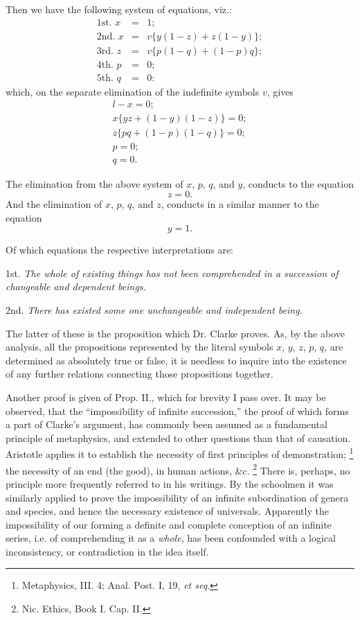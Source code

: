 \documentclass[oneside]{book}
\begin{document}
Then we have the following system of equations, viz.:
\begin{eqnarray*}
\textrm{1st. } x &=& 1 ; \\
\textrm{2nd. } x &=& v \{y(1 - z) + z(1 - y)\} ; \\
\textrm{3rd. } z &=& v \{p(1 - q) + (1 - p)q\} ; \\
\textrm{4th. } p &=& 0; \\
\textrm{5th. } q &=& 0 :
\end{eqnarray*}
which, on the separate elimination of the indefinite symbols $v$,
gives
\setcounter{equation}{0}
\begin{eqnarray}
l-x = 0; \\ %
x\{yz+(1-y)(1-z)\}=0; \\ %
z\{pq+(1-p)(1-q)\}=0; \\ %
p = 0; \\ %
q = 0.  %
\end{eqnarray}

The elimination from the above system of $x$, $p$, $q$, and $y$,
conducts to the equation
\[z=0.\]
And the elimination of $x$, $p$, $q$, and $z$, conducts in a similar
manner to the equation
\[y=1.\]

Of which equations the respective interpretations are:

1st. \textit{The whole of existing things has not been comprehended
in a succession of changeable and dependent beings.}

2nd. \textit{There has existed some one unchangeable and independent
being.}

The latter of these is the proposition which Dr. Clarke proves.
As, by the above analysis, all the propositions represented by the
literal symbols $x$, $y$, $z$, $p$, $q$, are determined as absolutely true or
false, it is needless to inquire into the existence of any further relations
connecting those propositions together.

Another proof is given of Prop. II., which for brevity I pass
over. It may be observed, that the ``impossibility of infinite
succession,'' the proof of which forms a part of Clarke's argument,
has commonly been assumed as a fundamental principle of
metaphysics, and extended to other questions than that of causation.
Aristotle applies it to establish the necessity of first principles
of demonstration; \footnote{Metaphysics, III. 4; Anal. Post. I, 19, \textit{et seq}.}
the necessity of an end (the good), in
human actions, \&c. \footnote{Nic. Ethics, Book I. Cap. II.} There is, perhaps, no
principle more frequently
referred to in his writings. By the schoolmen it was
similarly applied to prove the impossibility of an infinite subordination
of genera and species, and hence the necessary existence
of universals. Apparently the impossibility of our forming a
definite and complete conception of an infinite series, i.e. of
comprehending it as a \textit{whole}, has been confounded with a logical
inconsistency, or contradiction in the idea itself.
\end{document}
